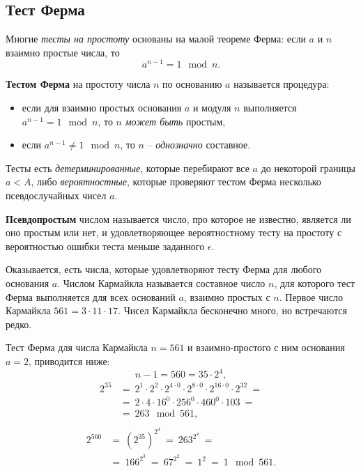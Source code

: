 \subsection{Тест Ферма}

Многие \emph{тесты на простоту} основаны на малой теореме Ферма: если $a$ и $n$ взаимно простые числа, то
    \[ a^{n-1} = 1 \mod n. \]

\textbf{Тестом Ферма} на простоту числа $n$ по основанию $a$ называется процедура:
\begin{itemize}
    \item если для взаимно простых основания $a$ и модуля $n$ выполняется $a^{n-1} = 1 \mod n$, то $n$ \emph{может быть} простым,
    \item если $a^{n-1} \ne 1 \mod n$, то $n$ -- \emph{однозначно} составное.
\end{itemize}

Тесты есть \emph{детерминированные}, которые перебирают все $a$ до некоторой границы $a < A$, либо \emph{вероятностные}, которые проверяют тестом Ферма несколько псевдослучайных чисел $a$.

\textbf{Псевдопростым} числом называется число, про которое не известно, является ли оно простым или нет, и удовлетворяющее вероятностному тесту на простоту с вероятностью ошибки теста меньше заданного $\epsilon$.

Оказывается, есть числа, которые удовлетворяют тесту Ферма для любого основания $a$. Числом Кармайкла называется составное число $n$, для которого тест Ферма выполняется для всех оснований $a$, взаимно простых с $n$. Первое число Кармайкла $561 = 3 \cdot 11 \cdot 17$. Чисел Кармайкла бесконечно много, но встречаются редко.

\example
Тест Ферма для числа Кармайкла $n = 561$ и взаимно-простого с ним основания $a = 2$, приводится ниже:
\[
    n - 1 = 560 = 35 \cdot 2^4,
\] \[ \begin{array}{ll}
    2^{35} & =~ 2^1 \cdot 2^2 \cdot 2^{4 \cdot 0} \cdot 2^{8 \cdot 0} \cdot 2^{16 \cdot 0} \cdot 2^{32} ~= \\
        & =~ 2 \cdot 4 \cdot 16^0 \cdot 256^0 \cdot 460^0 \cdot 103 ~= \\
        & =~ 263 \mod 561, \\
\end{array} \] \[ \begin{array}{ll}
    2^{560} & =~ \left( 2^{35} \right)^{2^4} ~=~ 263^{2^4} ~= \\
        & =~ 166^{2^3} ~=~ 67^{2^2} ~=~ 1^{2} ~=~ 1 \mod 561.
\end{array} \]
\exampleend
